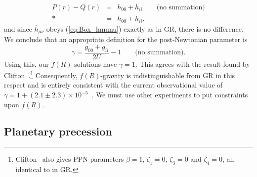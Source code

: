 \documentclass[aps,prd,amsfonts,amssymb,amsmath,nofootinbib,reprint,showpacs]{revtex4-1}
\newcommand{\eqnref}[1]{(\ref{eq:#1})}
\begin{document}
\begin{eqnarray}
P(r) - Q(r) & = & h_{00} + h_{ii} \qquad \text{(no summation)}\nonumber \\*
 & = & \overline{h}_{00} + \overline{h}_{ii},
\end{eqnarray}
and since $\overline{h}_{\mu\nu}$ obeys \eqnref{Box_hmunu} exactly as in GR, there is no difference. We conclude that an appropriate definition for the post-Newtonian parameter is
\begin{equation}
\gamma = \frac{g_{00} + g_{ii}}{2U} - 1 \qquad \text{(no summation)}.
\end{equation}
Using this, our $f(R)$ solutions have $\gamma = 1$. This agrees with the result found by Clifton~\cite{Clifton2008}.\footnote{Clifton~\cite{Clifton2008} also gives PPN parameters $\beta =1$, $\zeta_1 = 0$, $\zeta_3 = 0$ and $\zeta_4 = 0$, all identical to in GR.} Consequently, $f(R)$-gravity is indistinguishable from GR in this respect and is entirely consistent with the current observational value of $\gamma = 1 + (2.1 \pm 2.3) \times 10^{-5}$~\cite{Will2006, Bertotti2003}. We must use other experiments to put constraints upon $f(R)$.

\subsection{Planetary precession}
\end{document}
